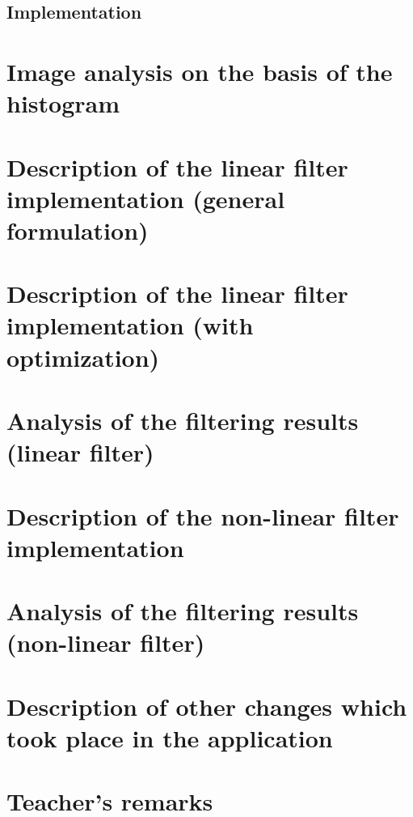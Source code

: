 \documentclass[12pt]{article}
\theoremstyle{definition}
\begin{document}
\subsection{Implementation}



\section{Image analysis on the basis of the histogram}

\section{Description of the linear filter implementation (general formulation)}

\section{Description of the linear filter implementation (with optimization)}

\section{Analysis of the filtering results (linear filter)}

\section{Description of the non-linear filter implementation }

\section{Analysis of the filtering results (non-linear filter)}

\section{Description of other changes which took place in the application}



\vfill
\section*{Teacher's remarks}
\begin{tabularx}{\textwidth}{|X|}
    \hline
    \vspace{7cm}
    \phantom{.} \\
    \hline
\end{tabularx}
\end{document}
